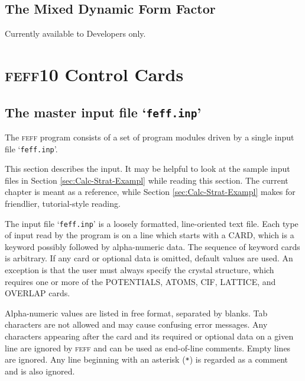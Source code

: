 \documentclass[11pt,oneside]{report} %
\newcommand{\feffcurrent}{\textsc{feff10}}
\newcommand{\program}[1]{\textsc{#1}}
\newcommand{\feff}{\program{feff}}
\newcommand{\file}[1]{`\texttt{#1}'}
\begin{document}
\section{The Mixed Dynamic Form Factor}
\label{sec:MDFF}

Currently available to Developers only.



\chapter{{\feffcurrent} Control Cards}
\label{sec:Input-Control-Cards}

\section{The master input file \file{feff.inp}}

The {\feff} program consists of a set of program modules driven by  a single input file \file{feff.inp}.  

This section describes the input. It may be helpful to look at the
sample input files in Section \ref{sec:Calc-Strat-Exampl} while
reading this section.  The current chapter is meant as a reference,
while Section \ref{sec:Calc-Strat-Exampl} makes for friendlier, tutorial-style reading.

The input file \file{feff.inp} is a loosely formatted, line-oriented
text file. Each type of input read by the program is on a line which
starts with a CARD, which is a keyword possibly followed by alpha-numeric data.  The sequence of keyword cards is arbitrary. If any card or optional data is omitted,
default values are used.  An exception is that the user must always specify the crystal structure, which requires one or more of the POTENTIALS, ATOMS, CIF, LATTICE, and OVERLAP cards.

Alpha-numeric values are listed in free format,
separated by blanks. Tab characters are not allowed and may cause confusing error
messages. Any characters appearing after the card and its required or
optional data on a given line are ignored by {\feff} and can be used
as end-of-line comments. Empty lines are ignored. Any
line beginning with an asterisk (\texttt{*}) is regarded as a comment
and is also ignored. 
\end{document}
